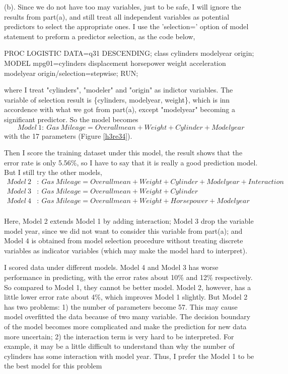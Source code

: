 \documentclass[letterpaper, 12pt]{article}
\newcommand{\ba}{$$\begin{aligned}}
\newcommand{\ea}{\end{aligned}$$}
\begin{document}
(b). Since we do not have too may variables, just to be safe, I will ignore the results from part(a), and still treat all independent variables as potential predictors to select the appropriate ones. I use the 'selection=' option of model statement to preform a predictor selection, as the code below,
\begin{Sascode}[store=class]
PROC LOGISTIC DATA=q31 DESCENDING;
class cylinders modelyear origin;
MODEL mpg01=cylinders displacement horsepower weight
 acceleration modelyear origin/selection=stepwise;
RUN;
\end{Sascode}
where I treat "cylinders", "modeler" and "origin" as indictor variables. The variable of selection result is \{cylinders, modelyear, weight\}, which is inn accordence with what we got from part(a), except "modelyear" becoming a significant predictor. So the model becomes 
$$
Model~1:~Gas~Mileage=Overallmean+Weight+Cylinder+Modelyear
$$
with the 17 parameters (Figure \ref{h3re34}).

Then I score the training dataset under this model, the result shows that the error rate is only 5.56\%, so I have to say that it is really a good prediction model. But I still try the other models,
\ba
Model~2&:~Gas~Mileage=Overallmean+Weight+Cylinder+Modelyear+Interaction\\
Model~3&:~Gas~Mileage=Overallmean+Weight+Cylinder\\
Model~4&:~Gas~Mileage=Overallmean+Weight+Horsepower+Modelyear\\
\ea

Here, Model 2 extends Model 1 by adding interaction; Model 3 drop the variable model year, since we did not want to consider this variable from part(a); and Model 4 is obtained from model selection procedure without treating discrete variables as indicator variables (which may make the model hard to interpret). 

I scored data under different models. Model 4 and Model 3 has worse performance in predicting, with the error rates about 10\% and 12\% respectively. So compared to Model 1, they cannot be better model. Model 2, however, has a little lower error rate about 4\%, which improves Model 1 slightly. But Model 2 has two problems: 1) the number of parameters become 57. This may cause model overfitted the data because of two many variable. The decision boundary of the model becomes more complicated and make the prediction for new data more uncertain; 2) the interaction term is very hard to be interpreted. For example, it may be a little difficult to understand than why the number of cylinders has some interaction with model year. Thus, I prefer the Model 1 to be the best model for this problem
\end{document}
